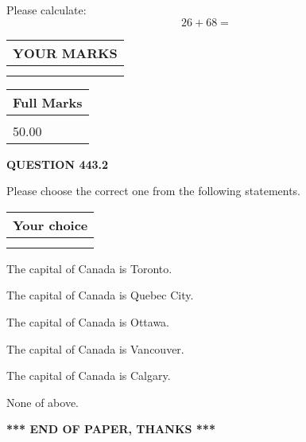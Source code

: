 \documentclass[12pt]{article}
\begin{document}
  
 
Please calculate:
\begin{equation}
26 +  %
68 = \nonumber
\end{equation}
 

 

 
  
\vspace{0.2in}
  
\noindent\begin{tabular}{|l|}
\hline
 YOUR MARKS  \\
\hline
 \\ 
 \\ 
\hline
\end{tabular}
\hspace{0.05in} \begin{tabular}{|l|}
\hline
 Full Marks  \\
\hline
 \\ 
50.00 \\
\hline
\end{tabular}
{\textbf{\Large{QUESTION
443.2 
}}}
  
  
Please choose the correct one from the following statements.
  
  
\noindent\hspace{3.0in} \begin{tabular}{|l|}
\hline
Your choice \\
\hline
 \\ 
 \\ 
\hline
\end{tabular}
  
  
 
 
The capital of Canada is Toronto.
 
 
The capital of Canada is Quebec City.
 
 
The capital of Canada is Ottawa.
 
 
The capital of Canada is Vancouver.
 
 
The capital of Canada is Calgary.
 
 
 None of above.
 
 
   
   
 \vspace{0.2in}
 
   
   
   
   
\vspace{1.0in} 
{\textbf{\large{ *** END OF PAPER, THANKS *** }}} 
   
\end{document}
